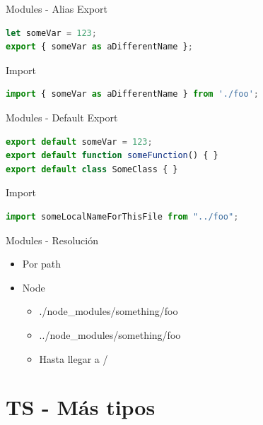 \documentclass[aspectratio=169]{beamer}
\begin{document}
\begin{frame}[fragile]{Modules - Alias}
Export
\begin{lstlisting}[language=JavaScript,basicstyle=\scriptsize]
let someVar = 123;
export { someVar as aDifferentName };
\end{lstlisting}
Import
\begin{lstlisting}[language=JavaScript,basicstyle=\scriptsize]
import { someVar as aDifferentName } from './foo';
\end{lstlisting}
\end{frame}

\begin{frame}[fragile]{Modules - Default}
Export
\begin{lstlisting}[language=JavaScript,basicstyle=\scriptsize]
export default someVar = 123;
export default function someFunction() { }
export default class SomeClass { }
\end{lstlisting}
Import
\begin{lstlisting}[language=JavaScript,basicstyle=\scriptsize]
import someLocalNameForThisFile from "../foo";
\end{lstlisting}
\end{frame}


\begin{frame}[fragile]{Modules - Resolución}
\begin{itemize}
	\item Por path

	\item Node
		\begin{itemize}
		\item ./node\_modules/something/foo
		\item ../node\_modules/something/foo
		\item Hasta llegar a /
	\end{itemize}
\end{itemize}

\end{frame}

{
    \section{TS - Más tipos}
}
\end{document}
